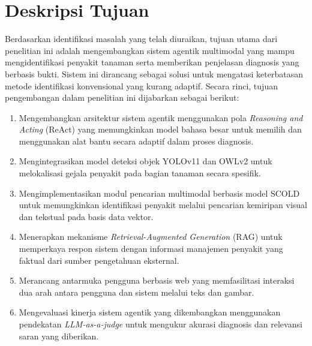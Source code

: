 
\section{Deskripsi Tujuan}
Berdasarkan identifikasi masalah yang telah diuraikan, tujuan utama dari penelitian ini adalah mengembangkan sistem agentik multimodal yang mampu mengidentifikasi penyakit tanaman serta memberikan penjelasan diagnosis yang berbasis bukti. Sistem ini dirancang sebagai solusi untuk mengatasi keterbatasan metode identifikasi konvensional yang kurang adaptif. Secara rinci, tujuan pengembangan dalam penelitian ini dijabarkan sebagai berikut:
\begin{enumerate}[nosep]
    \item Mengembangkan arsitektur sistem agentik menggunakan pola \textit{Reasoning and Acting} (ReAct) yang memungkinkan model bahasa besar untuk memilih dan menggunakan alat bantu secara adaptif dalam proses diagnosis.
    \item Mengintegrasikan model deteksi objek YOLOv11 dan OWLv2 untuk melokalisasi gejala penyakit pada bagian tanaman secara spesifik.
    \item Mengimplementasikan modul pencarian multimodal berbasis model SCOLD untuk memungkinkan identifikasi penyakit melalui pencarian kemiripan visual dan tekstual pada basis data vektor.
    \item Menerapkan mekanisme \textit{Retrieval-Augmented Generation} (RAG) untuk memperkaya respon sistem dengan informasi manajemen penyakit yang faktual dari sumber pengetahuan eksternal.
    \item Merancang antarmuka pengguna berbasis web yang memfasilitasi interaksi dua arah antara pengguna dan sistem melalui teks dan gambar.
    \item Mengevaluasi kinerja sistem agentik yang dikembangkan menggunakan pendekatan \textit{LLM-as-a-judge} untuk mengukur akurasi diagnosis dan relevansi saran yang diberikan.
\end{enumerate}

